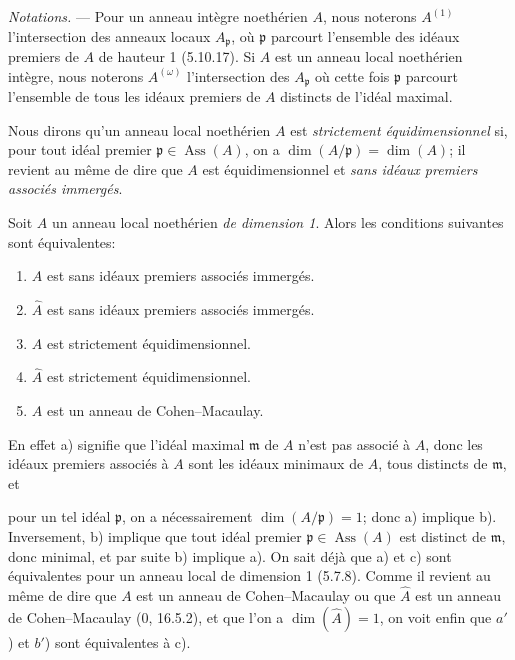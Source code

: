 \begin{env}[7.2.1]
\label{IV.2.s7.2.1-fr}
\emph{Notations.} --- Pour un anneau intègre noethérien $A$, nous noterons
$A^{(1)}$ l'intersection des anneaux locaux $A_{\mathfrak p}$, où
$\mathfrak p$ parcourt l'ensemble des idéaux premiers de $A$ de hauteur 1
(5.10.17). Si $A$ est un anneau local noethérien intègre, nous noterons
$A^{(\omega)}$ l'intersection des $A_{\mathfrak p}$ où cette fois
$\mathfrak p$ parcourt l'ensemble de tous les idéaux premiers de $A$
distincts de l'idéal maximal.

Nous dirons qu'un anneau local noethérien $A$ est \emph{strictement
équidimensionnel} si, pour tout idéal premier
$\mathfrak p\in\operatorname{Ass}(A)$, on a
$\dim(A/\mathfrak p)=\dim(A)$; il revient au même de dire que $A$ est
équidimensionnel et \emph{sans idéaux premiers associés immergés}.
\end{env}

\begin{example}[7.2.1.1]
\label{IV.2.s7.2.1.1-fr}
Soit $A$ un anneau local noethérien \emph{de dimension 1}. Alors les
conditions suivantes sont équivalentes:
\begin{enumerate}
\item[a)] $A$ est sans idéaux premiers associés immergés.
\item[$a'$)] $\widehat A$ est sans idéaux premiers associés immergés.
\item[b)] $A$ est strictement équidimensionnel.
\item[$b'$)] $\widehat A$ est strictement équidimensionnel.
\item[c)] $A$ est un anneau de Cohen--Macaulay.
\end{enumerate}
\end{example}

En effet a) signifie que l'idéal maximal $\mathfrak m$ de $A$ n'est pas
associé à $A$, donc les idéaux premiers associés à $A$ sont les idéaux
minimaux de $A$, tous distincts de $\mathfrak m$, et


pour un tel idéal $\mathfrak p$, on a nécessairement
$\dim(A/\mathfrak p)=1$; donc a) implique b). Inversement, b) implique que
tout idéal premier $\mathfrak p\in\operatorname{Ass}(A)$ est distinct de
$\mathfrak m$, donc minimal, et par suite b) implique a). On sait déjà que
a) et c) sont équivalentes pour un anneau local de dimension 1 (5.7.8).
Comme il revient au même de dire que $A$ est un anneau de Cohen--Macaulay ou
que $\widehat A$ est un anneau de Cohen--Macaulay (0, 16.5.2), et que l'on
a $\dim(\widehat A)=1$, on voit enfin que $a'$) et $b'$) sont équivalentes à
c).

